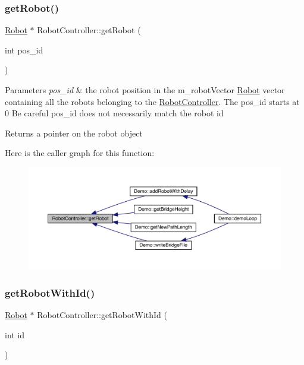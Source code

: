 \subsubsection{\texorpdfstring{get\+Robot()}{getRobot()}}
{\footnotesize\ttfamily \mbox{\hyperlink{class_robot}{Robot}} $\ast$ Robot\+Controller\+::get\+Robot (\begin{DoxyParamCaption}\item[{int}]{pos\+\_\+id }\end{DoxyParamCaption})}


\begin{DoxyParams}{Parameters}
{\em pos\+\_\+id} & the robot position in the m\+\_\+robot\+Vector \mbox{\hyperlink{class_robot}{Robot}} vector containing all the robots belonging to the \mbox{\hyperlink{class_robot_controller}{Robot\+Controller}}. The pos\+\_\+id starts at 0 Be careful pos\+\_\+id does not necessarily match the robot id \\
\hline
\end{DoxyParams}
\begin{DoxyReturn}{Returns}
a pointer on the robot object 
\end{DoxyReturn}
Here is the caller graph for this function\+:\nopagebreak
\begin{figure}[H]
\begin{center}
\leavevmode
\includegraphics[width=350pt]{class_robot_controller_ae421f813b81632c35ec3494717fd0f12_icgraph}
\end{center}
\end{figure}
\mbox{\label{class_robot_controller_aa247b8c90ab585358f07a18c891c8b31}} 
\subsubsection{\texorpdfstring{get\+Robot\+With\+Id()}{getRobotWithId()}}
{\footnotesize\ttfamily \mbox{\hyperlink{class_robot}{Robot}} $\ast$ Robot\+Controller\+::get\+Robot\+With\+Id (\begin{DoxyParamCaption}\item[{int}]{id }\end{DoxyParamCaption})}


